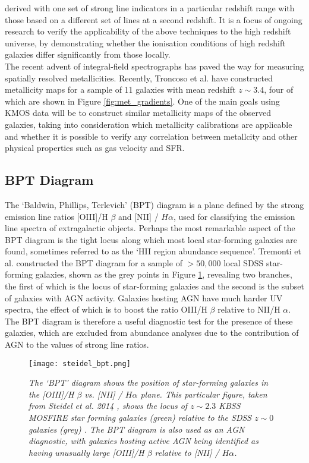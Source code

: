 \documentclass{literature}
\begin{document}
derived with one set of strong line indicators in a particular redshift range with those based on a different set of lines at a second redshift. It is a focus of ongoing research to verify the applicability of the above techniques to the high redshift universe, by demonstrating whether the ionisation conditions of high redshift galaxies differ significantly from those locally. \\

The recent advent of integral-field spectrographs has paved the way for measuring spatially resolved metallicities. Recently, Troncoso et al. \citep{Troncoso_2014} have constructed metallicity maps for a sample of 11 galaxies with mean redshift $z \sim 3.4$, four of which are shown in Figure \ref{fig:met_gradients}. One of the main goals using KMOS data will be to construct similar metallicity maps of the observed galaxies, taking into consideration which metallicity calibrations are applicable and whether it is possible to verify any correlation between metallcity and other physical properties such as gas velocity and SFR.   
 

\subsection{BPT Diagram}\label{subsec:BPT-diagram}
The `Baldwin, Phillips, Terlevich' (BPT) diagram \citep{Baldwin1981} is a plane defined by the strong emission line ratios [OIII]/H $\beta$ and [NII] / $H\alpha$, used for classifying the emission line spectra of extragalactic objects. Perhaps the most remarkable aspect of the BPT diagram is the tight locus along which most local star-forming galaxies are found, sometimes referred to as the `HII region abundance sequence'. Tremonti et al. constructed the BPT diagram for a sample of $> 50,000$ local SDSS star-forming galaxies, shown as the grey points in Figure \ref{fig:steidel_bpt}, revealing two branches, the first of which is the locus of star-forming galaxies and the second is the subset of galaxies with AGN activity. Galaxies hosting AGN have much harder UV spectra, the effect of which is to boost the ratio OIII/H $\beta$ relative to NII/H $\alpha$. The BPT diagram is therefore a useful diagnostic test for the presence of these galaxies, which are excluded from abundance analyses due to the contribution of AGN to the values of strong line ratios. \\ 

\begin{figure}[!htp]
\centering
\texttt{[image: steidel\_bpt.png]}
\caption{\footnotesize{\emph{The `BPT' diagram shows the position of star-forming galaxies in the [OIII]/H $\beta$ vs. [NII] / $H\alpha$ plane. This particular figure, taken from Steidel et al. 2014 \citep{Steidel2014}, shows the locus of $z \sim 2.3$ KBSS MOSFIRE star forming galaxies (green) relative to the SDSS $z \sim 0$ galaxies (grey) \citep{Tremonti2004}. The BPT diagram is also used as an AGN diagnostic, with galaxies hosting active AGN being identified as having unusually large [OIII]/H $\beta$ relative to [NII] / $H\alpha$.}}}
\label{fig:steidel_bpt}
\end{figure} 
\end{document}
